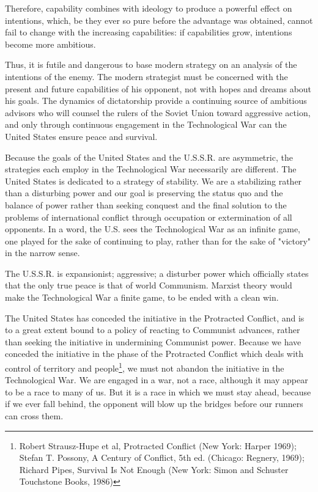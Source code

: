 Therefore, capability combines with ideology to produce a powerful effect on intentions, which, be they ever so pure before the advantage was obtained, cannot fail to change with the increasing capabilities: if capabilities grow, intentions become more ambitious.

Thus, it is futile and dangerous to base modern strategy on an analysis of the intentions of the enemy. The modern strategist must be concerned with the present and future capabilities of his opponent, not with hopes and dreams about his goals. The dynamics of dictatorship provide a continuing source of ambitious advisors who will counsel the rulers of the Soviet Union toward aggressive action, and only through continuous engagement in the Technological War can the United States ensure peace and survival.

Because the goals of the United States and the U.S.S.R. are asymmetric, the strategies each employ in the Technological War necessarily are different. The United States is dedicated to a strategy of stability. We are a stabilizing rather than a disturbing power and our goal is preserving the status quo and the balance of power rather than seeking conquest and the final solution to the problems of international conflict through occupation or extermination of all opponents. In a word, the U.S. sees the Technological War as an infinite game, one played for the sake of continuing to play, rather than for the sake of "victory" in the narrow sense.

The U.S.S.R. is expansionist; aggressive; a disturber power which officially states that the only true peace is that of world Communism. Marxist theory would make the Technological War a finite game, to be ended with a clean win.

The United States has conceded the initiative in the Protracted Conflict, and is to a great extent bound to a policy of reacting to Communist advances, rather than seeking the initiative in undermining Communist power. Because we have conceded the initiative in the phase of the Protracted Conflict which deals with control of territory and people\footnote{Robert Strausz-Hupe et al, Protracted Conflict (New York: Harper 1969); Stefan T. Possony, A Century of Conflict, 5th ed. (Chicago: Regnery, 1969); Richard Pipes, Survival Is Not Enough (New York: Simon and Schuster Touchstone Books, 1986)}, we must not abandon the initiative in the Technological War. We are engaged in a war, not a race, although it may appear to be a race to many of us. But it is a race in which we must stay ahead, because if we ever fall  behind, the opponent will blow up the bridges before our runners can cross them.

